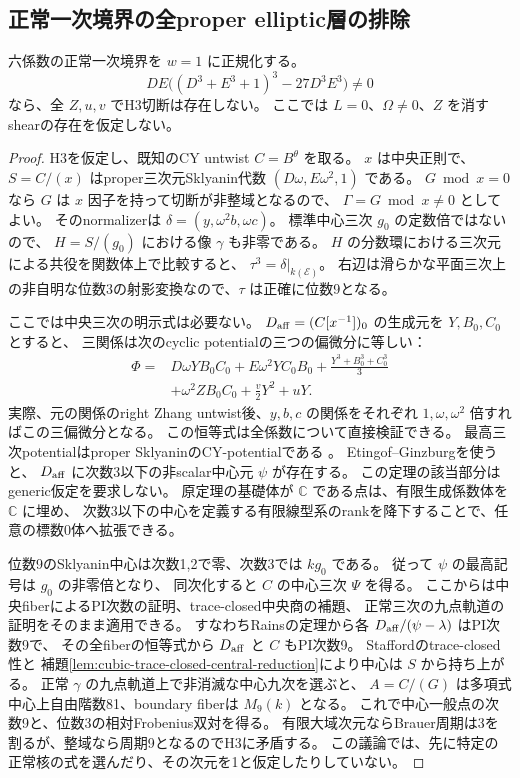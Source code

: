 \subsection{正常一次境界の全proper elliptic層の排除}
\label{subsec:cubic-third-root-unit-boundary-elliptic-exclusion}
\begin{theorem}[楕円Sklyanin境界の構造的障害]
\label{thm:cubic-third-root-unit-boundary-elliptic-exclusion}
六係数の正常一次境界を $w=1$ に正規化する。
\[
 DE\bigl((D^3+E^3+1)^3-27D^3E^3\bigr)\ne0
\]
なら、全 $Z,u,v$ でH3切断は存在しない。
ここでは $L=0$、$\Omega\ne0$、$Z$ を消すshearの存在を仮定しない。
\end{theorem}
\begin{proof}
H3を仮定し、既知のCY untwist $C=B^\theta$ を取る。
$x$ は中央正則で、$S=C/(x)$ はproper三次元Sklyanin代数
$(D\omega,E\omega^2,1)$ である。
$G\bmod x=0$ なら $G$ は $x$ 因子を持って切断が非整域となるので、
$\Gamma=G\bmod x\ne0$ としてよい。
そのnormalizerは $\delta=(y,\omega^2b,\omega c)$。
標準中心三次 $g_0$ の定数倍ではないので、
$H=S/(g_0)$ における像 $\gamma$ も非零である。
$H$ の分数環における三次元による共役を関数体上で比較すると、
$\tau^3=\delta|_{k(\mathcal E)}$。
右辺は滑らかな平面三次上の非自明な位数3の射影変換なので、$\tau$ は正確に位数9となる。

ここでは中央三次の明示式は必要ない。
$D_{\rm aff}=(C[x^{-1}])_0$ の生成元を $Y,B_0,C_0$ とすると、
三関係は次のcyclic potentialの三つの偏微分に等しい：
\begin{align*}
 \Phi={}&D\omega YB_0C_0+E\omega^2YC_0B_0
       +\frac{Y^3+B_0^3+C_0^3}{3}\\
       &+\omega^2Z B_0C_0+\frac v2Y^2+uY.
\end{align*}
実際、元の関係のright Zhang untwist後、$y,b,c$ の関係をそれぞれ
$1,\omega,\omega^2$ 倍すればこの三偏微分となる。
この恒等式は全係数について直接検証できる。
最高三次potentialはproper SklyaninのCY-potentialである
\cite[Corollary~6.1]{ISSklyanin}。
Etingof--Ginzburg\cite[Theorem~3.3.2(ii), proof in \S8.3]{EGdelpezzo}を使うと、
$D_{\rm aff}$ に次数3以下の非scalar中心元 $\psi$ が存在する。
この定理の該当部分はgeneric仮定を要求しない。
原定理の基礎体が $\mathbb C$ である点は、有限生成係数体を $\mathbb C$ に埋め、
次数3以下の中心を定義する有限線型系のrankを降下することで、任意の標数0体へ拡張できる。

位数9のSklyanin中心は次数1,2で零、次数3では $kg_0$ である。
従って $\psi$ の最高記号は $g_0$ の非零倍となり、
同次化すると $C$ の中心三次 $\Psi$ を得る。
ここからは中央fiberによるPI次数の証明、trace-closed中央商の補題、
正常三次の九点軌道の証明をそのまま適用できる。
すなわちRainsの定理から各 $D_{\rm aff}/(\psi-\lambda)$ はPI次数9で、
その全fiberの恒等式から $D_{\rm aff}$ と $C$ もPI次数9。
Staffordのtrace-closed性と
補題\ref{lem:cubic-trace-closed-central-reduction}により中心は $S$ から持ち上がる。
正常 $\gamma$ の九点軌道上で非消滅な中心九次を選ぶと、
$A=C/(G)$ は多項式中心上自由階数81、boundary fiberは $M_9(k)$ となる。
これで中心一般点の次数9と、位数3の相対Frobenius双対を得る。
有限大域次元ならBrauer周期は3を割るが、整域なら周期9となるのでH3に矛盾する。
この議論では、先に特定の正常核の式を選んだり、その次元を1と仮定したりしていない。
\end{proof}

